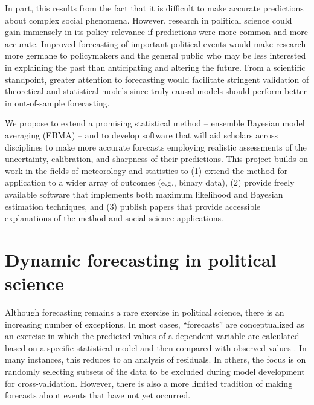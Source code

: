 \documentclass[pdftex,12pt,fullpage,oneside]{amsart}
\begin{document}
In part, this results from the fact that it is difficult to make
accurate predictions about complex social phenomena. However, research
in political science could gain immensely in its policy relevance if
predictions were more common and more accurate.  Improved forecasting
of important political events would make research more germane to
policymakers and the general public who may be less interested in
explaining the past than anticipating and altering the future.  From a
scientific standpoint, greater attention to forecasting would
facilitate stringent validation of theoretical and statistical models
since truly causal models should perform better in out-of-sample
forecasting.

We propose to extend a promising statistical method -- ensemble
Bayesian model averaging (EBMA) -- and to develop software that will
aid scholars across disciplines to make more accurate forecasts employing
realistic assessments of the uncertainty, calibration, and sharpness of their
predictions.
This project builds on work in the fields of meteorology and
statistics to (1) extend the method for application to a wider array
of outcomes (e.g., binary data), (2) provide freely available software
that implements both maximum likelihood and Bayesian estimation
techniques, and (3) publish papers that provide accessible
explanations of the method and social science applications.


\section{Dynamic forecasting in political science}

Although forecasting remains a rare exercise in political science, there
is an increasing number of exceptions.  In most cases, ``forecasts''
are conceptualized as an exercise in which the predicted values of a
dependent variable are calculated based on a specific statistical
model and then compared with observed values
\citep[e.g.,][]{Hildebrand:etal:1976}. In many instances, this reduces
to an analysis of residuals.  In others, the focus is on randomly
selecting subsets of the data to be excluded during model development
for cross-validation.  However, there is also a more limited tradition
of making forecasts about events that have not yet occurred.
\end{document}
